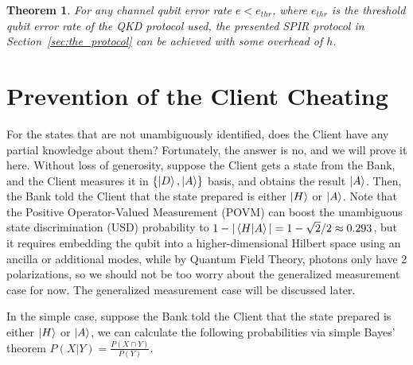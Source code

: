 \documentclass[%
 reprint,
superscriptaddress,
 amsmath,amssymb,
 aps,
]{revtex4-2}
\newtheorem{theorem}{Theorem}[section]
\begin{document}
\begin{theorem}
    For any channel qubit error rate $e<e_{thr}$, where $e_{thr}$ is the threshold qubit error rate of the QKD protocol used, the presented SPIR protocol in Section~\ref{sec:the_protocol} can be achieved with some overhead of $h$.
\label{thm:walking_theorem}
\end{theorem}



\section{Prevention of the Client Cheating}
\label{sec:Client_Cheating}

For the states that are not unambiguously identified, does the Client have any partial knowledge about them? Fortunately, the answer is no, and we will prove it here. Without loss of generosity, suppose the Client gets a state from the Bank, and the Client measures it in $\{\ket{D}, \ket{A}\}$ basis, and obtains the result $\ket{A}$. Then, the Bank told the Client that the state prepared is either $\ket{H}$ or $\ket{A}$. Note that the Positive Operator-Valued Measurement (POVM) can boost the unambiguous state discrimination (USD) probability to $1-|\bra{H}\ket{A}|=1-\sqrt{2}/2\approx0.293$, but it requires embedding the qubit into a higher-dimensional Hilbert space using an ancilla or additional modes, while by Quantum Field Theory, photons only have 2 polarizations, so we should not be too worry about the generalized measurement case for now. The generalized measurement case will be discussed later.

In the simple case, suppose the Bank told the Client that the state prepared is either $\ket{H}$ or $\ket{A}$, we can calculate the following probabilities via simple Bayes' theorem $P(X|Y) = \frac{P(X \cap Y)}{P(Y)}$.
\end{document}
